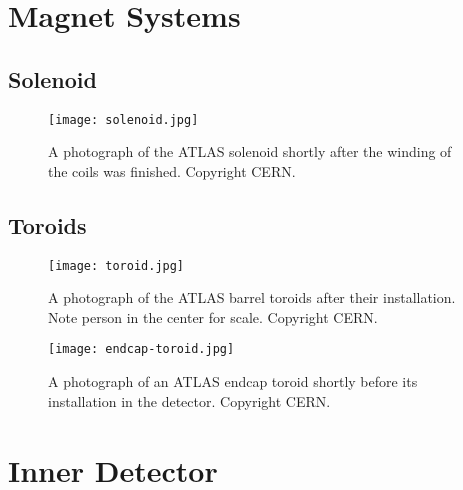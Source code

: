 







\section{Magnet Systems}

\subsection{Solenoid}
\label{atlas:magnets:solenoid}

\begin{figure}
\centering
\texttt{[image: solenoid.jpg]}
\label{fig:detector:solenoid}
\caption{A photograph of the ATLAS solenoid shortly after the winding of the coils was finished. Copyright CERN.}
\end{figure}



\subsection{Toroids}



\begin{figure}
\centering
\texttt{[image: toroid.jpg]}
\label{fig:detector:solenoid}
\caption{A photograph of the ATLAS barrel toroids after their installation. Note person in the center for scale. Copyright CERN.}
\end{figure}





\begin{figure}
\centering
\texttt{[image: endcap-toroid.jpg]}
\label{fig:detector:solenoid}
\caption{A photograph of an ATLAS endcap toroid shortly before its installation in the detector. Copyright CERN.}
\end{figure}



\section{Inner Detector}

